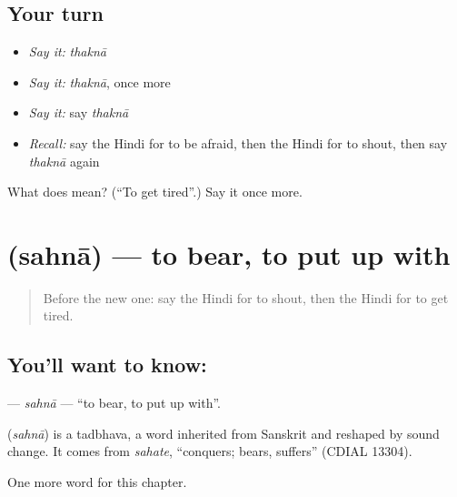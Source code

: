\subsection*{Your turn}
\begin{itemize}
\raggedright
  \item \emph{Say it:} \emph{thaknā}
  \item \emph{Say it:} \emph{thaknā}, once more
  \item \emph{Say it:} say \emph{thaknā}
  \item \emph{Recall:} say the Hindi for to be afraid, then the Hindi for to shout, then say \emph{thaknā} again
\end{itemize}

\begin{tcolorbox}[breakable,colback=teal!4,colframe=teal!35!black,title={Before you move on}]
What does  mean? (\textquotedblleft{}To get tired\textquotedblright{}.) Say it once more.
\end{tcolorbox}
\section[\texorpdfstring{\hi{सहना} (sahnā)}{सहना (sahnā)}]{ (sahnā) — to bear, to put up with}

\label{lesson:HI-C179-sahna}



\begin{quote}
Before the new one: say the Hindi for to shout, then the Hindi for to get tired.
\end{quote}

\subsection*{You'll want to know: }
\textbf{} — \emph{sahnā} — \textquotedblleft{}to bear, to put up with\textquotedblright{}.

\begin{cousinweb}
\textbf{} (\emph{sahnā}) is a tadbhava, a word inherited from Sanskrit and reshaped by sound change. It comes from \emph{sahate}, \textquotedblleft{}conquers; bears, suffers\textquotedblright{} (CDIAL 13304).
\end{cousinweb}

\begin{grammarlens}[title={What you've built}]
One more word for this chapter.
\end{grammarlens}

